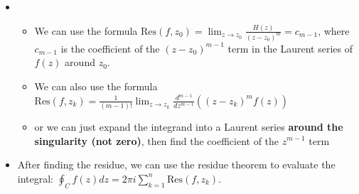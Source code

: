 \begin{example}
\begin{itemize}
        \item[] \begin{itemize}
                  \item We can use the formula $\text{Res}(f, z_0) = \lim_{z \to z_0} \frac{H(z)}{(z - z_0)^m} = c_{m-1}$, where $c_{m-1}$ is the coefficient of the $(z - z_0)^{m-1}$ term in the Laurent series of $f(z)$ around $z_0$.
                  \item We can also use the formula $\text{Res}(f,z_k) = \frac{1}{(m - 1)!}\lim_{z \to z_k} \frac{d^{m-1}}{dz^{m-1}} ((z - z_k)^m f(z))$
                  \item or we can just expand the integrand into a Laurent series \textbf{around the singularity (not zero)}, then find the coefficient of the $z^{m-1}$ term
              \end{itemize}
        \item After finding the residue, we can use the residue theorem to evaluate the integral: $\oint_C f(z)dz = 2\pi i \sum_{k=1}^n \text{Res}(f, z_k)$.
    \end{itemize}
\end{example}

